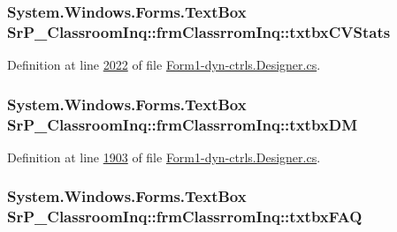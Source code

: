 \hypertarget{class_sr_p___classroom_inq_1_1frm_classrrom_inq_a931a3be146fb3f28b5ee10428a2ac0a4}{
\subsubsection[{txtbx\-C\-V\-Stats}]{\setlength{\rightskip}{0pt plus 5cm}\-System.\-Windows.\-Forms.\-Text\-Box {\bf \-Sr\-P\-\_\-\-Classroom\-Inq\-::frm\-Classrrom\-Inq\-::txtbx\-C\-V\-Stats}}}
\label{class_sr_p___classroom_inq_1_1frm_classrrom_inq_a931a3be146fb3f28b5ee10428a2ac0a4}


\-Definition at line \hyperlink{_form1-dyn-ctrls_8_designer_8cs_source_l02022}{2022} of file \hyperlink{_form1-dyn-ctrls_8_designer_8cs_source}{\-Form1-\/dyn-\/ctrls.\-Designer.\-cs}.

\hypertarget{class_sr_p___classroom_inq_1_1frm_classrrom_inq_aec9084c69e8f5c7398f201a074db8550}{
\subsubsection[{txtbx\-D\-M}]{\setlength{\rightskip}{0pt plus 5cm}\-System.\-Windows.\-Forms.\-Text\-Box {\bf \-Sr\-P\-\_\-\-Classroom\-Inq\-::frm\-Classrrom\-Inq\-::txtbx\-D\-M}}}
\label{class_sr_p___classroom_inq_1_1frm_classrrom_inq_aec9084c69e8f5c7398f201a074db8550}


\-Definition at line \hyperlink{_form1-dyn-ctrls_8_designer_8cs_source_l01903}{1903} of file \hyperlink{_form1-dyn-ctrls_8_designer_8cs_source}{\-Form1-\/dyn-\/ctrls.\-Designer.\-cs}.

\hypertarget{class_sr_p___classroom_inq_1_1frm_classrrom_inq_a891afdbfba3ee4c1b690b938693ecabe}{
\subsubsection[{txtbx\-F\-A\-Q}]{\setlength{\rightskip}{0pt plus 5cm}\-System.\-Windows.\-Forms.\-Text\-Box {\bf \-Sr\-P\-\_\-\-Classroom\-Inq\-::frm\-Classrrom\-Inq\-::txtbx\-F\-A\-Q}}}
\label{class_sr_p___classroom_inq_1_1frm_classrrom_inq_a891afdbfba3ee4c1b690b938693ecabe}


